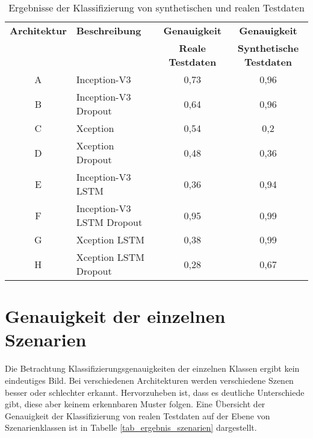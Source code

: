 \begin{table}[h]
\small
\centering
\def\arraystretch{1.4}
\begin{tabular}{c p{3cm} c c}
\textbf{Architektur} & \textbf{Beschreibung} & \textbf{Genauigkeit} & \textbf{Genauigkeit} \\
 & & \textbf{Reale Testdaten} & \textbf{Synthetische Testdaten} \\
\hline
A & Inception-V3 & 0,73 & 0,96 \\
\hline
B & Inception-V3 \newline Dropout & 0,64 & 0,96 \\
\hline
C & Xception & 0,54 & 0,2 \\
\hline
D & Xception \newline Dropout & 0,48 & 0,36 \\
\hline 
E & Inception-V3 \newline LSTM & 0,36 & 0,94 \\
\hline
F & Inception-V3 \newline LSTM \newline Dropout & 0,95 & 0,99 \\
\hline
G & Xception \newline LSTM & 0,38 & 0,99 \\
\hline
H & Xception \newline LSTM \newline Dropout & 0,28 & 0,67 \\
\hline
\end{tabular}
\caption{Ergebnisse der Klassifizierung von synthetischen und realen Testdaten}
\label{tab_ergebnis_synth}
\end{table}


\section{Genauigkeit der einzelnen Szenarien}
\label{ergebnis_szenarien}

Die Betrachtung Klassifizierungsgenauigkeiten der einzelnen Klassen ergibt kein eindeutiges Bild. Bei verschiedenen Architekturen werden verschiedene Szenen besser oder schlechter erkannt. Hervorzuheben ist, dass es deutliche Unterschiede gibt, diese aber keinem erkennbaren Muster folgen. Eine Übersicht der Genauigkeit der Klassifizierung von realen Testdaten auf der Ebene von Szenarienklassen ist in Tabelle \ref{tab_ergebnis_szenarien} dargestellt.

